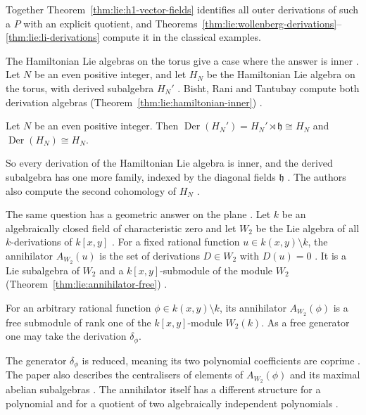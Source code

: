 Together Theorem~\ref{thm:lie:h1-vector-fields} identifies all outer
derivations of such a $P$ with an explicit quotient, and
Theorems~\ref{thm:lie:wollenberg-derivations}--\ref{thm:lie:li-derivations}
compute it in the classical examples.

The Hamiltonian Lie algebras on the torus give a case where the answer is
inner \cite[p.~1]{BishtRaniTantubay2026}. Let $N$ be an even positive integer,
and let $H_{N}$ be the Hamiltonian Lie algebra on the torus, with derived
subalgebra $H_{N}'$ \cite[p.~1]{BishtRaniTantubay2026}. Bisht, Rani and
Tantubay compute both derivation algebras
(Theorem~\ref{thm:lie:hamiltonian-inner}) \cite[Theorems~17--18,
p.~18]{BishtRaniTantubay2026}.

\begin{theorem}\label{thm:lie:hamiltonian-inner}
Let $N$ be an even positive integer. Then
$\operatorname{Der}(H_{N}')=H_{N}'\rtimes\mathfrak{h}\cong H_{N}$ and
$\operatorname{Der}(H_{N})\cong H_{N}$.
\end{theorem}

So every derivation of the Hamiltonian Lie algebra is inner, and the derived
subalgebra has one more family, indexed by the diagonal fields $\mathfrak{h}$
\cite[p.~18]{BishtRaniTantubay2026}. The authors also compute the second
cohomology of $H_{N}$ \cite[Corollary~24, p.~23]{BishtRaniTantubay2026}.

The same question has a geometric answer on the plane
\cite[p.~1]{IenaPetravchukRegeta2009}. Let $k$ be an algebraically closed
field of characteristic zero and let $W_2$ be the Lie algebra of all
$k$-derivations of $k[x,y]$ \cite[p.~1]{IenaPetravchukRegeta2009}. For a fixed
rational function $u\in k(x,y)\setminus k$, the annihilator $A_{W_2}(u)$ is
the set of derivations $D\in W_2$ with $D(u)=0$
\cite[p.~2]{IenaPetravchukRegeta2009}. It is a Lie subalgebra of $W_2$ and a
$k[x,y]$-submodule of the module $W_2$
(Theorem~\ref{thm:lie:annihilator-free})
\cite[p.~2]{IenaPetravchukRegeta2009}.

\begin{theorem}\label{thm:lie:annihilator-free}
For an arbitrary rational function $\phi\in k(x,y)\setminus k$, its annihilator
$A_{W_2}(\phi)$ is a free submodule of rank one of the $k[x,y]$-module $W_2(k)$.
As a free generator one may take the derivation $\delta_\phi$.
\end{theorem}

The generator $\delta_\phi$ is reduced, meaning its two polynomial
coefficients are coprime \cite[p.~2]{IenaPetravchukRegeta2009}. The paper also
describes the centralisers of elements of $A_{W_2}(\phi)$ and its maximal
abelian subalgebras \cite[p.~2]{IenaPetravchukRegeta2009}. The annihilator
itself has a different structure for a polynomial and for a quotient of two
algebraically independent polynomials \cite[p.~2]{IenaPetravchukRegeta2009}.

